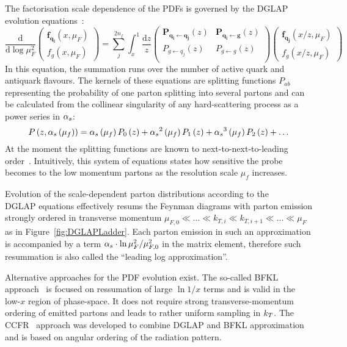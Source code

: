 The factorisation scale dependence of the PDFs is governed by the DGLAP evolution equations~\cite{Altarelli:1977zs,Gribov:1972,Dokshitzer:1977,Balitsky:1978}:
\begin{equation}
\frac{\mathrm{d}}{\mathrm{d}\log{\mu_F^2}}
 \begin{pmatrix}
	\mathbf{f_{q_i}}\left(x,\mu_F\right) \\
	f_g\left(x,\mu_F\right)
 \end{pmatrix} = 
\sum_j^{2n_f}{\int_x^1{\frac{\mathrm{d}z}{z}
 \begin{pmatrix}
  \mathbf{P_{q_i \leftarrow q_j}}\left(z\right) & \mathbf{P_{q_i \leftarrow  g}}\left(z\right) \\
  P_{g \leftarrow q_j}\left(z\right) & P_{g \leftarrow g}\left(z\right) \\
 \end{pmatrix}
 \begin{pmatrix}
	\mathbf{f_{q_j}}\left(x/z,\mu_F\right) \\
	f_g\left(x/z,\mu_F\right)
 \end{pmatrix}
}}
\end{equation}
In this equation, the summation runs over the number of active quark and antiquark flavours. The kernels of these equations are splitting functions $P_{ab}$ representing the probability of one parton splitting into several partons and can be calculated from the collinear singularity of any hard-scattering process as a power series in $\mbox{$\alpha_{s}$}$:
\begin{equation}
P\left(z,\as\left(\mu_f\right)\right) = \as\left(\mu_f\right) P_0\left(z\right) + \as^2\left(\mu_f\right)P_1\left(z\right) + \as^3\left(\mu_f\right)P_2\left(z\right) + \dots
\label{eq:splittingfunc}
\end{equation}
At the moment the splitting functions are known to next-to-next-to-leading order~\cite{Vogt:2004mw,Moch:2004pa}. Intuitively, this system of equations states how sensitive the probe becomes to the low momentum partons as the resolution scale $\mu_f$ increases. %

Evolution of the scale-dependent parton distributions according to the \\DGLAP equations effectively resums the Feynman diagrams with parton emission strongly ordered in transverse momentum $ \mu_{F,0} \ll \ldots \ll k_{T,i} \ll k_{T,i+1} \ll \ldots \ll \mu_F$ as in Figure~\ref{fig:DGLAPLadder}. Each parton emission in such an approximation is accompanied by a term $\mbox{$\alpha_{s}$}\cdot\ln{\mu^2_F/\mu^2_{F,0}}$ in the matrix element, therefore such resummation is also called the ``leading log approximation''.

Alternative approaches for the PDF evolution exist. The so-called BFKL approach~\cite{Balitsky:1978,Kuraev:1977fs} is focused on ressumation of large $\ln{1/x}$ terms and is valid in the low-$x$ region of phase-space. It does not require strong transverse-momentum ordering of emitted partons and leads to rather uniform sampling in $\mbox{$k_{T}$}$. The CCFR~\cite{Ciafaloni:1987ur,Catani:1989sg,Catani:1989yc,Martin:1996by} approach was developed to combine DGLAP and BFKL approximation and is based on angular ordering of the radiation pattern.
